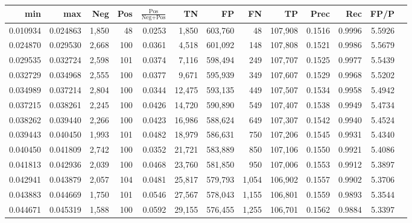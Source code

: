 \begin{tabular}{rrrrrrrrrrrrr}
\toprule
     min &      max &   Neg & Pos & $\frac{\text{Pos}}{\text{Neg}+\text{Pos}}$ &      TN &      FP &      FN &      TP &   Prec &    Rec &   FP/P \\
\midrule
0.010934 & 0.024863 & 1,850 &  48 &                                     0.0253 &   1,850 & 603,760 &      48 & 107,908 & 0.1516 & 0.9996 & 5.5926 \\
0.024870 & 0.029530 & 2,668 & 100 &                                     0.0361 &   4,518 & 601,092 &     148 & 107,808 & 0.1521 & 0.9986 & 5.5679 \\
0.029535 & 0.032724 & 2,598 & 101 &                                     0.0374 &   7,116 & 598,494 &     249 & 107,707 & 0.1525 & 0.9977 & 5.5439 \\
0.032729 & 0.034968 & 2,555 & 100 &                                     0.0377 &   9,671 & 595,939 &     349 & 107,607 & 0.1529 & 0.9968 & 5.5202 \\
0.034989 & 0.037214 & 2,804 & 100 &                                     0.0344 &  12,475 & 593,135 &     449 & 107,507 & 0.1534 & 0.9958 & 5.4942 \\
0.037215 & 0.038261 & 2,245 & 100 &                                     0.0426 &  14,720 & 590,890 &     549 & 107,407 & 0.1538 & 0.9949 & 5.4734 \\
0.038262 & 0.039440 & 2,266 & 100 &                                     0.0423 &  16,986 & 588,624 &     649 & 107,307 & 0.1542 & 0.9940 & 5.4524 \\
0.039443 & 0.040450 & 1,993 & 101 &                                     0.0482 &  18,979 & 586,631 &     750 & 107,206 & 0.1545 & 0.9931 & 5.4340 \\
0.040450 & 0.041809 & 2,742 & 100 &                                     0.0352 &  21,721 & 583,889 &     850 & 107,106 & 0.1550 & 0.9921 & 5.4086 \\
0.041813 & 0.042936 & 2,039 & 100 &                                     0.0468 &  23,760 & 581,850 &     950 & 107,006 & 0.1553 & 0.9912 & 5.3897 \\
0.042941 & 0.043879 & 2,057 & 104 &                                     0.0481 &  25,817 & 579,793 &   1,054 & 106,902 & 0.1557 & 0.9902 & 5.3706 \\
0.043883 & 0.044669 & 1,750 & 101 &                                     0.0546 &  27,567 & 578,043 &   1,155 & 106,801 & 0.1559 & 0.9893 & 5.3544 \\
0.044671 & 0.045319 & 1,588 & 100 &                                     0.0592 &  29,155 & 576,455 &   1,255 & 106,701 & 0.1562 & 0.9884 & 5.3397 \\

\end{tabular}
